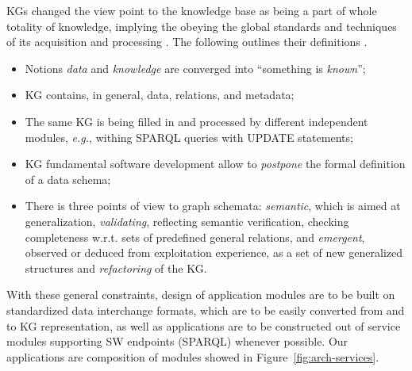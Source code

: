 \documentclass[
]{ceurart}
\begin{document}
KGs changed the view point to the knowledge base as being a part of whole totality of knowledge, implying the obeying the global standards and techniques of its acquisition and processing \cite{hogan}.  The following outlines their definitions \cite{hogan}.
 \begin{itemize}
  \item Notions \emph{data} and \emph{knowledge} are converged into ``something is \emph{known}'';
  \item KG contains, in general, data, relations, and metadata;
  \item The same KG is being filled in and processed by different independent modules, \emph{e.g.}, withing SPARQL queries with UPDATE statements;
  \item KG fundamental software development allow to \emph{postpone} the formal definition of a data schema;
  \item There is three points of view to graph schemata: \emph{semantic}, which is aimed at generalization, \emph{validating}, reflecting semantic verification, checking completeness w.r.t. sets of predefined general relations, and \emph{emergent}, observed or deduced from exploitation experience, as a set of new generalized structures and \emph{refactoring} of the KG.
  \end{itemize}
With these general constraints, design of application modules are to be built on standardized data interchange formats, which are to be easily converted from and to KG representation, as well as applications are to be constructed out of service modules supporting SW endpoints (SPARQL) whenever possible.  Our applications are composition of modules showed in Figure~\ref{fig:arch-services}.
\end{document}

